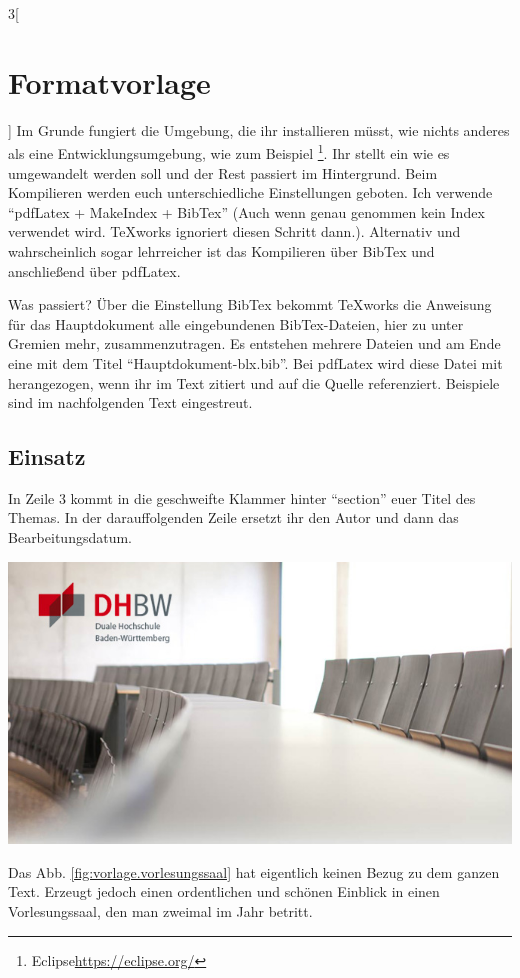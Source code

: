 \begin{multicols}{3}[\section{Formatvorlage}]
Im Grunde fungiert die Umgebung, die ihr installieren müsst, wie nichts anderes als eine Entwicklungsumgebung, wie zum Beispiel \footnote{Eclipse\url{https://eclipse.org/}}. Ihr stellt ein wie es umgewandelt werden soll und der Rest passiert im Hintergrund. Beim Kompilieren werden euch unterschiedliche Einstellungen geboten. Ich verwende \enquote{pdfLatex + MakeIndex + BibTex} (Auch wenn genau genommen kein Index verwendet wird. TeXworks ignoriert diesen Schritt dann.). Alternativ und wahrscheinlich sogar lehrreicher ist das Kompilieren über BibTex und anschließend über pdfLatex. 

Was passiert? Über die Einstellung BibTex bekommt TeXworks die Anweisung für das Hauptdokument alle eingebundenen BibTex-Dateien, hier zu unter Gremien mehr, zusammenzutragen. Es entstehen mehrere Dateien und am Ende eine mit dem Titel \enquote{Hauptdokument-blx.bib}. Bei pdfLatex wird diese Datei mit herangezogen, wenn ihr im Text zitiert und auf die Quelle referenziert. Beispiele sind im nachfolgenden Text eingestreut. 



\subsection*{Einsatz}
In Zeile 3 kommt in die geschweifte Klammer hinter \enquote{section} euer Titel des Themas. In der darauffolgenden Zeile ersetzt ihr den Autor und dann das Bearbeitungsdatum.
\begin{Figure}
\includegraphics[width=\linewidth]{Kapitel/Vorlage/Grafiken/bild2_dhbw.jpg}
\label{fig:vorlage.vorlesungssaal}
\end{Figure}
Das Abb. \ref{fig:vorlage.vorlesungssaal} hat eigentlich keinen Bezug zu dem ganzen Text. Erzeugt jedoch einen ordentlichen und schönen Einblick in einen Vorlesungssaal, den man zweimal im Jahr betritt.


\end{multicols}
